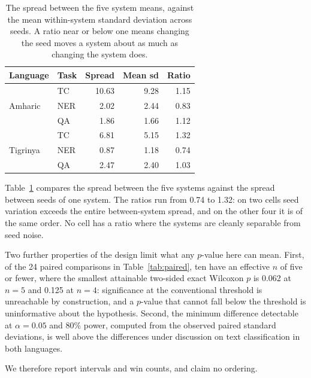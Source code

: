 \documentclass[11pt]{article}
\begin{document}
\begin{table}[t]
\centering
\small
\begin{tabular}{llrrr}
\toprule
Language & Task & Spread & Mean sd & Ratio \\
\midrule
\multirow{3}{*}{Amharic}
 & TC  & 10.63 & 9.28 & 1.15 \\
 & NER & 2.02  & 2.44 & 0.83 \\
 & QA  & 1.86  & 1.66 & 1.12 \\
\midrule
\multirow{3}{*}{Tigrinya}
 & TC  & 6.81  & 5.15 & 1.32 \\
 & NER & 0.87  & 1.18 & 0.74 \\
 & QA  & 2.47  & 2.40 & 1.03 \\
\bottomrule
\end{tabular}
\caption{The spread between the five system means, against the mean
within-system standard deviation across seeds. A ratio near or below one
means changing the seed moves a system about as much as changing the system
does.}
\label{tab:snr}
\end{table}

Table~\ref{tab:snr} compares the spread between the five systems against the
spread between seeds of one system. The ratios run from 0.74 to 1.32: on two
cells seed variation exceeds the entire between-system spread, and on the
other four it is of the same order. No cell has a ratio where the systems are
cleanly separable from seed noise.

Two further properties of the design limit what any $p$-value here can mean.
First, of the 24 paired comparisons in Table~\ref{tab:paired}, ten have an
effective $n$ of five or fewer, where the smallest attainable two-sided exact
Wilcoxon $p$ is 0.062 at $n=5$ and 0.125 at $n=4$: significance at the
conventional threshold is unreachable by construction, and a $p$-value that
cannot fall below the threshold is uninformative about the hypothesis.
Second, the minimum difference detectable at $\alpha = 0.05$ and 80\% power,
computed from the observed paired standard deviations, is well above the
differences under discussion on text classification in both languages.

We therefore report intervals and win counts, and claim no ordering.
\end{document}
